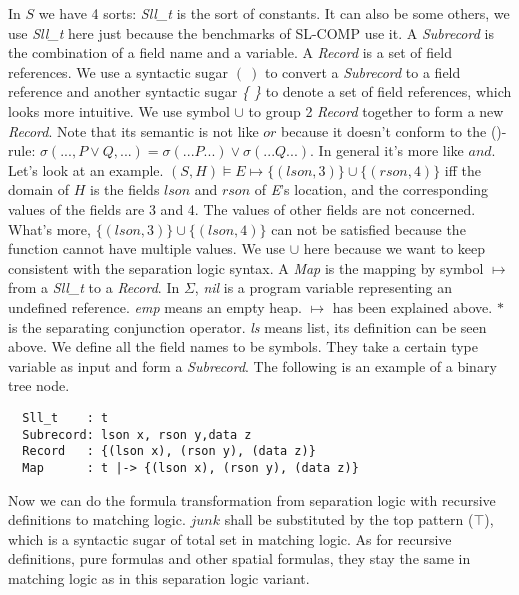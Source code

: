 \documentclass{article}
\theoremstyle{plain}
\begin{document}
In $S$ we have 4 sorts: \textit{Sll\_t} is the sort of constants. It can also be some others, we use \textit{Sll\_t} here just because the benchmarks of SL-COMP use it. A \textit{Subrecord} is the combination of a field name and a variable. A \textit{Record} is a set of field references. We use a syntactic sugar $\mathit{(\ )}$ to convert a \textit{Subrecord} to a field reference and another syntactic sugar \textit{\{ \}} to denote a set of field references, which looks more intuitive. We use symbol $\cup$ to group 2 \textit{Record} together to form a new \textit{Record}. Note that its semantic is not like $or$ because it doesn't conform to the (\vee)-rule: $\sigma (...,P\vee Q,...)=\sigma(...P...)\vee\sigma(...Q...)$. In general it's more like $and$. Let's look at an example. $(S,H) \models E \mapsto \{(lson,3)\}\cup\{(rson,4)\}$ iff the domain of $H$ is the fields $lson$ and $rson$ of \textit{E}'s location, and the corresponding values of the fields are 3 and 4. The values of other fields are not concerned. What's more, $\{(lson,3)\}\cup\{(lson,4)\}$ can not be satisfied because the function cannot have multiple values. We use $\cup$ here because we want to keep consistent with the separation logic syntax. A \textit{Map} is the mapping by symbol $\mapsto$ from a \textit{Sll\_t} to a \textit{Record}. In $\Sigma$, \textit{nil} is a program variable representing an undefined reference. \textit{emp} means an empty heap. $\mapsto$ has been explained above. $*$ is the separating conjunction operator. \textit{ls} means list, its definition can be seen above. We define all the field names to be symbols. They take a certain type variable as input and form a \textit{Subrecord}. The following is an example of a binary tree node.
\begin{verbatim}
  Sll_t    : t
  Subrecord: lson x, rson y,data z
  Record   : {(lson x), (rson y), (data z)}
  Map      : t |-> {(lson x), (rson y), (data z)}   
\end{verbatim}

Now we can do the formula transformation from separation logic with recursive definitions to matching logic. $junk$ shall be substituted by the top pattern ($\top$), which is a syntactic sugar of total set in matching logic. As for recursive definitions, pure formulas and other spatial formulas, they stay the same in matching logic as in this separation logic variant.
\begin{comment}
\begin{algorithm}
	\KwIn{a separation logic pattern $P$}
	\KwOut{a matching logic formula}
    \Switch{the pattern $P$}{
      \uCase{$\Pi$}
            {\Return{$\Pi$} \;}
      \uCase{$junk$}
            {\Return{$true$} \;}
      \uCase{$\Sigma$}
            {\Return{$\Sigma$} \;}
      \uCase{$\exists x . Q$}
            {\Return{$\exists x . Q$} \;}
      \uCase{$\Pi \wedge \mathtt{tobool}(\Sigma) \wedge \Delta$}
            {\Return{$\Pi \wedge \Sigma \wedge \Delta$ \;}}
    }
	\caption{The separation logic to matching logic  transformation}
\end{algorithm}
\end{comment}
\end{document}
